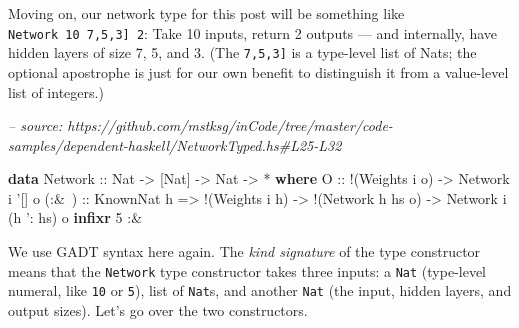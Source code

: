 \documentclass[]{article}
\newenvironment{Shaded}{}{}
\newcommand{\CommentTok}[1]{\textcolor[rgb]{0.38,0.63,0.69}{\textit{#1}}}
\newcommand{\DataTypeTok}[1]{\textcolor[rgb]{0.56,0.13,0.00}{#1}}
\newcommand{\DecValTok}[1]{\textcolor[rgb]{0.25,0.63,0.44}{#1}}
\newcommand{\FunctionTok}[1]{\textcolor[rgb]{0.02,0.16,0.49}{#1}}
\newcommand{\KeywordTok}[1]{\textcolor[rgb]{0.00,0.44,0.13}{\textbf{#1}}}
\newcommand{\NormalTok}[1]{#1}
\newcommand{\OtherTok}[1]{\textcolor[rgb]{0.00,0.44,0.13}{#1}}
\begin{document}
Moving on, our network type for this post will be something like
\texttt{Network\ 10\ \textquotesingle{}{[}7,5,3{]}\ 2}: Take 10 inputs, return 2
outputs --- and internally, have hidden layers of size 7, 5, and 3. (The
\texttt{\textquotesingle{}{[}7,5,3{]}} is a type-level list of Nats; the
optional \texttt{\textquotesingle{}} apostrophe is just for our own benefit to
distinguish it from a value-level list of integers.)

\begin{Shaded}
\begin{Highlighting}[]
\CommentTok{-- source: https://github.com/mstksg/inCode/tree/master/code-samples/dependent-haskell/NetworkTyped.hs#L25-L32}

\KeywordTok{data} \DataTypeTok{Network}\OtherTok{ ::} \DataTypeTok{Nat} \OtherTok{->}\NormalTok{ [}\DataTypeTok{Nat}\NormalTok{] }\OtherTok{->} \DataTypeTok{Nat} \OtherTok{->} \FunctionTok{*} \KeywordTok{where}
    \DataTypeTok{O}\OtherTok{     ::} \FunctionTok{!}\NormalTok{(}\DataTypeTok{Weights}\NormalTok{ i o)}
          \OtherTok{->} \DataTypeTok{Network}\NormalTok{ i '[] o}
\OtherTok{    (:&~) ::} \DataTypeTok{KnownNat}\NormalTok{ h}
          \OtherTok{=>} \FunctionTok{!}\NormalTok{(}\DataTypeTok{Weights}\NormalTok{ i h)}
          \OtherTok{->} \FunctionTok{!}\NormalTok{(}\DataTypeTok{Network}\NormalTok{ h hs o)}
          \OtherTok{->} \DataTypeTok{Network}\NormalTok{ i (h '}\FunctionTok{:}\NormalTok{ hs) o}
\KeywordTok{infixr} \DecValTok{5} \FunctionTok{:&~}
\end{Highlighting}
\end{Shaded}

We use GADT syntax here again. The \emph{kind signature} of the type constructor
means that the \texttt{Network} type constructor takes three inputs: a
\texttt{Nat} (type-level numeral, like \texttt{10} or \texttt{5}), list of
\texttt{Nat}s, and another \texttt{Nat} (the input, hidden layers, and output
sizes). Let's go over the two constructors.
\end{document}
